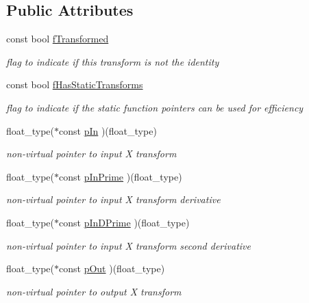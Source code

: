\subsection*{Public Attributes}
\begin{DoxyCompactItemize}
\item 
const bool \hyperlink{classc2__transformation_a18c8ee93daf24675a40905aaceeebd72}{f\+Transformed}
\begin{DoxyCompactList}\small\item\em flag to indicate if this transform is not the identity \end{DoxyCompactList}\item 
const bool \hyperlink{classc2__transformation_a66489da404feec82b2db467a9c3e7a1e}{f\+Has\+Static\+Transforms}
\begin{DoxyCompactList}\small\item\em flag to indicate if the static function pointers can be used for efficiency \end{DoxyCompactList}\item 
float\+\_\+type($\ast$const \hyperlink{classc2__transformation_a4600cf8952fc112bb50f4f312738d022}{p\+In} )(float\+\_\+type)
\begin{DoxyCompactList}\small\item\em non-\/virtual pointer to input X transform \end{DoxyCompactList}\item 
float\+\_\+type($\ast$const \hyperlink{classc2__transformation_a4600103aeb9ea6aec1124ac0085bf268}{p\+In\+Prime} )(float\+\_\+type)
\begin{DoxyCompactList}\small\item\em non-\/virtual pointer to input X transform derivative \end{DoxyCompactList}\item 
float\+\_\+type($\ast$const \hyperlink{classc2__transformation_a875d75e4e0299753f6ea34bd06594ede}{p\+In\+D\+Prime} )(float\+\_\+type)
\begin{DoxyCompactList}\small\item\em non-\/virtual pointer to input X transform second derivative \end{DoxyCompactList}\item 
float\+\_\+type($\ast$const \hyperlink{classc2__transformation_ae898d76b8582ecc9fc7bb5a6eb6ca1b4}{p\+Out} )(float\+\_\+type)
\begin{DoxyCompactList}\small\item\em non-\/virtual pointer to output X transform \end{DoxyCompactList}\end{DoxyCompactItemize}
